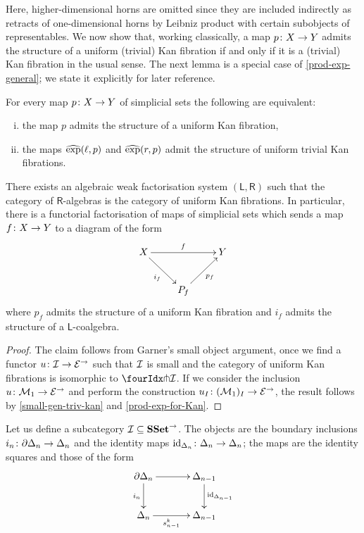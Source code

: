 \documentclass[reqno,10pt,a4paper,oneside]{amsart}
\begin{document}
Here, higher-dimensional horns are omitted since they are included indirectly as retracts of one-dimensional horns 
by Leibniz product with certain subobjects of representables. We now show that, working classically, a map $p \co X \to Y$ admits the structure of a uniform (trivial) Kan fibration if and only if it is a (trivial) Kan fibration in the usual sense. 
The next lemma is a special case of \cref{prod-exp-general}; we state it explicitly for later reference.
  
 \begin{lemma} \label{prod-exp-for-Kan}  For every  map $p \co X \to Y$ of simplicial sets the following are equivalent: 
\begin{enumerate}[(i)]
\item the map $p$ admits the structure of a uniform Kan fibration,
\item the maps $\hatexp(\intervall, p)$ and $\hatexp(\intervalr, p)$ admit the structure of
uniform trivial Kan fibrations. 
\end{enumerate} 
\end{lemma}

\begin{proposition} There exists an algebraic weak factorisation system $(\mathsf{L}, \mathsf{R})$
such that the category of $\mathsf{R}$-algebras is the category of uniform Kan fibrations. 
In particular, there is a functorial factorisation of maps of simplicial sets which sends
a map $f \co X \to Y$ to a diagram of the form
\[
\xymatrix{ 
X \ar[rr]^f \ar[dr]_{i_f}  & & Y \\
 & P_f \ar[ur]_{p_f} }
 \]
 where $p_f$ admits the structure of  a uniform Kan fibration and 
 $i_f$ admits the structure of a $\mathsf{L}$-coalgebra.
\end{proposition} 

\begin{proof} The claim follows from Garner's small object argument, once we find a 
functor $u \co \cal{I} \rightarrow \catE^\to$ such that $\cal{I}$ is small and the
category of uniform Kan fibrations is isomorphic to $\liftr{\cal{I}}$. If we consider
the inclusion $u \co \mathcal{M}_1 \to \cal{E}^\to$ and perform the construction
$u_\interval \co (\mathcal{M}_1)_\interval \to \catE^\to$, the result follows 
by \cref{small-gen-triv-kan} and \cref{prod-exp-for-Kan}. 
\end{proof}


\medskip
 
Let us define a subcategory $\cal{I} \subseteq \SSet^\to$. The objects are the boundary inclusions
$i_n \co \partial \Delta_n \to \Delta_n$ and the identity maps $\id_{\Delta_n} \co \Delta_n \to \Delta_n$; the
maps are the identity squares and those of the form
 \[
\xymatrix@C=1.2cm{
  \partial \Delta_n
  \ar[r]
  \ar[d]_{i_n}
&
  \Delta_{n-1}
  \ar[d]^{\id_{\Delta_{n-1}}}
\\
  \Delta_n
  \ar[r]_-{s^k_{n-1}}
&
  \Delta_{n-1}
}
\] 
\end{document}
